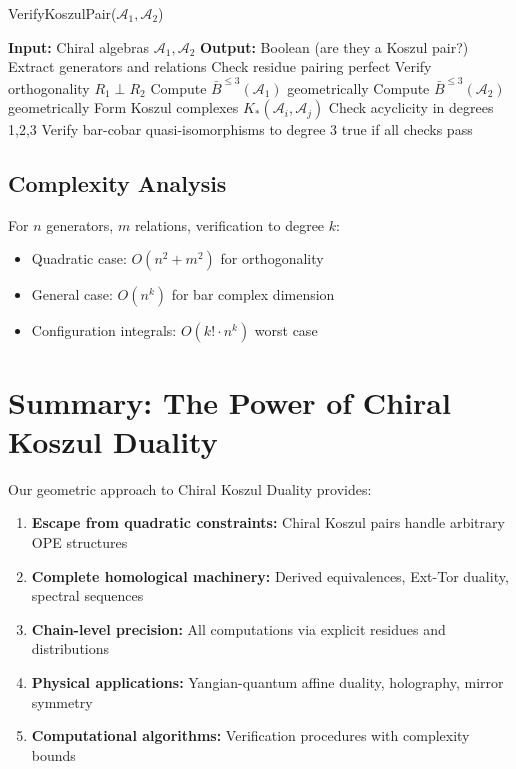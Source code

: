 \begin{algorithm}
\caption{VerifyKoszulPair($\mathcal{A}_1, \mathcal{A}_2$)}
\begin{algorithmic}[1]
\State \textbf{Input:} Chiral algebras $\mathcal{A}_1, \mathcal{A}_2$
\State \textbf{Output:} Boolean (are they a Koszul pair?)
\State
{}
    \State Extract generators and relations
    \State Check residue pairing perfect
    \State Verify orthogonality $R_1 \perp R_2$
\Else
    \State Compute $\bar{B}^{\leq 3}(\mathcal{A}_1)$ geometrically
    \State Compute $\bar{B}^{\leq 3}(\mathcal{A}_2)$ geometrically
    \State Form Koszul complexes $K_*(\mathcal{A}_i, \mathcal{A}_j)$
    \State Check acyclicity in degrees 1,2,3
\EndIf
\State Verify bar-cobar quasi-isomorphisms to degree 3
\State \Return true if all checks pass
\end{algorithmic}
\end{algorithm}

\subsection{Complexity Analysis}

For $n$ generators, $m$ relations, verification to degree $k$:
\begin{itemize}
\item Quadratic case: $O(n^2 + m^2)$ for orthogonality
\item General case: $O(n^k)$ for bar complex dimension
\item Configuration integrals: $O(k! \cdot n^k)$ worst case
\end{itemize}


\section{Summary: The Power of Chiral Koszul Duality}

Our geometric approach to Chiral Koszul Duality provides:

\begin{enumerate}
\item \textbf{Escape from quadratic constraints:} Chiral Koszul pairs handle arbitrary OPE structures

\item \textbf{Complete homological machinery:} Derived equivalences, Ext-Tor duality, spectral sequences

\item \textbf{Chain-level precision:} All computations via explicit residues and distributions

\item \textbf{Physical applications:} Yangian-quantum affine duality, holography, mirror symmetry

\item \textbf{Computational algorithms:} Verification procedures with complexity bounds
\end{enumerate}

